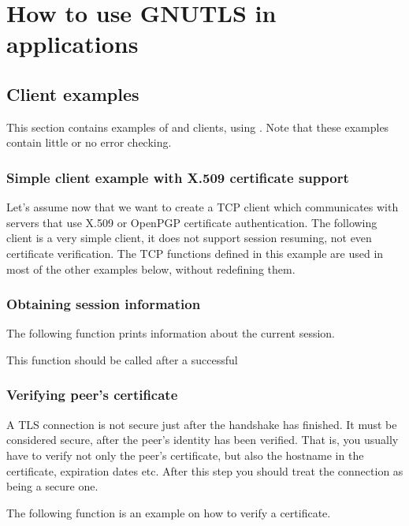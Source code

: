 \chapter{How to use GNUTLS in applications}



\label{examples}
\section{Client examples}
This section contains examples of \tls{} and \ssl{} clients, using \gnutls{}. 
Note that these examples contain little or no error checking.

\subsection{Simple client example with X.509 certificate support}
Let's assume now that we want to create a TCP client which communicates
with servers that use X.509 or OpenPGP certificate authentication. The following client
is a very simple \tls{} client, it does not support session resuming, not
even certificate verification. The TCP functions defined in this example
are used in most of the other examples below, without redefining them.


\subsection{Obtaining session information}
The following function prints information about the current \tls{} session.
\par
This function should be called after a successful



\subsection{Verifying peer's certificate}
\par A TLS connection is not secure just after the handshake has finished.
It must be considered secure, after the peer's identity has been
verified. That is, you usually have to verify not only the peer's 
certificate, but also the hostname in the certificate, expiration dates etc. 
After this step you should treat the connection as being a secure one.

\par
The following function is an example on how to verify a certificate.

